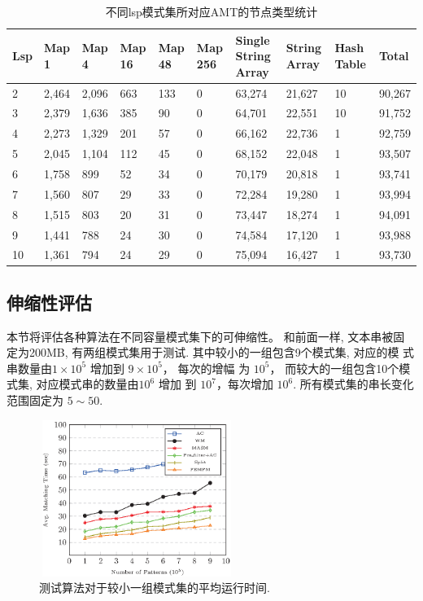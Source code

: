 \begin{table}[!h]
  \centering
  \caption{不同lsp模式集所对应AMT的节点类型统计}
  \scriptsize
  \label{tab:node types}
  \begin{tabular}{p{10pt}p{15pt}p{15pt}p{15pt}p{15pt}p{15pt}p{25pt}p{25pt}p{20pt}p{25pt}}
 \hline
 Lsp &
 Map 1 &
 Map 4 &
 Map 16 &
 Map 48 &
 Map 256 &
 Single String Array &
 String Array   &
 Hash Table &
 Total\\
 \hline
 2  & 2,464 & 2,096 & 663 & 133 & 0 & 63,274 &  21,627 & 10 & 90,267\\
 3  & 2,379 & 1,636 & 385 & 90  & 0 & 64,701 &  22,551 & 10 & 91,752\\
 4  & 2,273 & 1,329 & 201 & 57  & 0 & 66,162 &  22,736 &  1 & 92,759\\
 5  & 2,045 & 1,104 & 112 & 45  & 0 & 68,152 &  22,048 &  1 & 93,507\\
 6  & 1,758 &   899 &  52 & 34  & 0 & 70,179 &  20,818 &  1 & 93,741\\
 7  & 1,560 &   807 &  29 & 33  & 0 & 72,284 &  19,280 &  1 & 93,994\\
 8  & 1,515 &   803 &  20 & 31  & 0 & 73,447 &  18,274 &  1 & 94,091\\
 9  & 1,441 &   788 &  24 & 30  & 0 & 74,584 &  17,120 &  1 & 93,988\\
10  & 1,361 &   794 &  24 & 29  & 0 & 75,094 &  16,427 &  1 & 93,730\\
\hline
  \end{tabular}
\end{table}

\subsection{伸缩性评估}

本节将评估各种算法在不同容量模式集下的可伸缩性。 和前面一样, 文本串被固
定为200MB, 有两组模式集用于测试. 其中较小的一组包含9个模式集, 对应的模
式串数量由$1 \times 10^5$ 增加到 $9 \times 10^5$， 每次的增幅
为 $10^5$， 而较大的一组包含10个模式集, 对应模式串的数量由$10^6$ 增加
到 $10^7$，每次增加 $10^6$. 所有模式集的串长变化范围固定为 $5 \sim
50$.


\begin{figure}[!h]
  \centering
  \includegraphics[height=2in, width=2.5in]{figures/2_MPM/small_group}
  \caption{测试算法对于较小一组模式集的平均运行时间.}
  \label{fig:small_group}
\end{figure}

